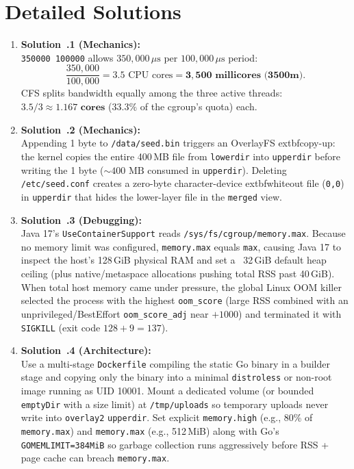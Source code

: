 \section{Detailed Solutions}
\begin{enumerate}[leftmargin=18pt]
  \item \textbf{Solution~\thechapter.1 (Mechanics):}\\
  \texttt{350000 100000} allows $350{,}000\,\mu\text{s}$ per $100{,}000\,\mu\text{s}$ period:
  \begin{equation*}
  \frac{350{,}000}{100{,}000} = 3.5\text{ CPU cores} = \mathbf{3{,}500\text{ millicores (3500m)}}.
  \end{equation*}
  CFS splits bandwidth equally among the three active threads: $3.5 / 3 \approx \mathbf{1.167\text{ cores}}$ ($33.3\%$ of the cgroup's quota) each.

  \item \textbf{Solution~\thechapter.2 (Mechanics):}\\
  Appending 1 byte to \texttt{/data/seed.bin} triggers an OverlayFS 	extbf{copy-up}: the kernel copies the entire 400\,MB file from \texttt{lowerdir} into \texttt{upperdir} before writing the 1 byte ($\sim 400\text{ MB}$ consumed in \texttt{upperdir}). Deleting \texttt{/etc/seed.conf} creates a zero-byte character-device 	extbf{whiteout} file (\texttt{0,0}) in \texttt{upperdir} that hides the lower-layer file in the \texttt{merged} view.

  \item \textbf{Solution~\thechapter.3 (Debugging):}\\
  Java 17's \texttt{UseContainerSupport} reads \texttt{/sys/fs/cgroup/memory.max}. Because no memory limit was configured, \texttt{memory.max} equals \texttt{max}, causing Java 17 to inspect the host's 128\,GiB physical RAM and set a ~32\,GiB default heap ceiling (plus native/metaspace allocations pushing total RSS past 40\,GiB). When total host memory came under pressure, the global Linux OOM killer selected the process with the highest \texttt{oom\_score} (large RSS combined with an unprivileged/BestEffort \texttt{oom\_score\_adj} near $+1000$) and terminated it with \texttt{SIGKILL} (exit code $128+9 = 137$).

  \item \textbf{Solution~\thechapter.4 (Architecture):}\\
  Use a multi-stage \texttt{Dockerfile} compiling the static Go binary in a builder stage and copying only the binary into a minimal \texttt{distroless} or non-root image running as UID 10001. Mount a dedicated volume (or bounded \texttt{emptyDir} with a size limit) at \texttt{/tmp/uploads} so temporary uploads never write into \texttt{overlay2} \texttt{upperdir}. Set explicit \texttt{memory.high} (e.g., 80\% of \texttt{memory.max}) and \texttt{memory.max} (e.g., 512\,MiB) along with Go's \texttt{GOMEMLIMIT=384MiB} so garbage collection runs aggressively before RSS + page cache can breach \texttt{memory.max}.


\end{enumerate}
